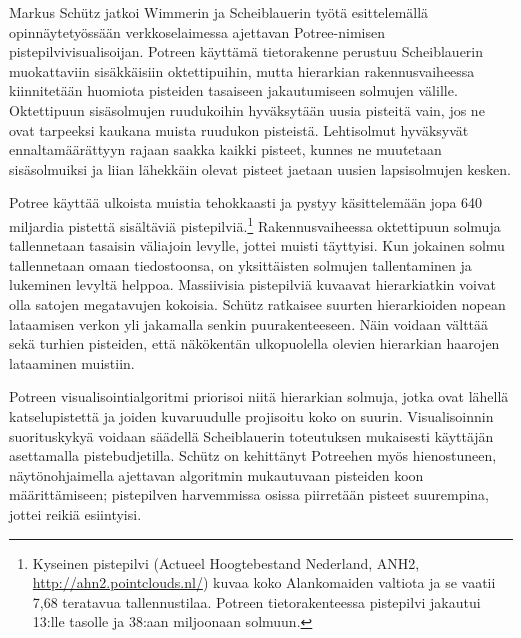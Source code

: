 Markus Schütz jatkoi Wimmerin ja Scheiblauerin työtä esittelemällä opinnäytetyössään verkkoselaimessa ajettavan Potree-nimisen pistepilvivisualisoijan. Potreen käyttämä tietorakenne perustuu Scheiblauerin muokattaviin sisäkkäisiin oktettipuihin, mutta hierarkian rakennusvaiheessa kiinnitetään huomiota pisteiden tasaiseen jakautumiseen solmujen välille. Oktettipuun sisäsolmujen ruudukoihin hyväksytään uusia pisteitä vain, jos ne ovat tarpeeksi kaukana muista ruudukon pisteistä. Lehtisolmut hyväksyvät ennaltamäärättyyn rajaan saakka kaikki pisteet, kunnes ne muutetaan sisäsolmuiksi ja liian lähekkäin olevat pisteet jaetaan uusien lapsisolmujen kesken. \cite{potree}

Potree käyttää ulkoista muistia tehokkaasti ja pystyy käsittelemään jopa 640 miljardia pistettä sisältäviä pistepilviä.\footnote{Kyseinen pistepilvi (Actueel Hoogtebestand Nederland, ANH2, \url{http://ahn2.pointclouds.nl/}) kuvaa koko Alankomaiden valtiota ja se vaatii 7,68 teratavua tallennustilaa. Potreen tietorakenteessa pistepilvi jakautui 13:lle tasolle ja 38:aan miljoonaan solmuun.} Rakennusvaiheessa oktettipuun solmuja tallennetaan tasaisin väliajoin levylle, jottei muisti täyttyisi. Kun jokainen solmu tallennetaan omaan tiedostoonsa, on yksittäisten solmujen tallentaminen ja lukeminen levyltä helppoa. Massiivisia pistepilviä kuvaavat hierarkiatkin voivat olla satojen megatavujen kokoisia. Schütz ratkaisee suurten hierarkioiden nopean lataamisen verkon yli jakamalla senkin puurakenteeseen. Näin voidaan välttää sekä turhien pisteiden, että näkökentän ulkopuolella olevien hierarkian haarojen lataaminen muistiin. \cite{potree}

Potreen visualisointialgoritmi priorisoi niitä hierarkian solmuja, jotka ovat lähellä katselupistettä ja joiden kuvaruudulle projisoitu koko on suurin. Visualisoinnin suorituskykyä voidaan säädellä Scheiblauerin toteutuksen mukaisesti käyttäjän asettamalla pistebudjetilla. Schütz on kehittänyt Potreehen myös hienostuneen, näytönohjaimella ajettavan algoritmin mukautuvaan pisteiden koon määrittämiseen; pistepilven harvemmissa osissa piirretään pisteet suurempina, jottei reikiä esiintyisi. \cite{potree}